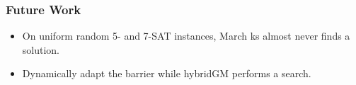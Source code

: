 \documentclass[aspectratio=169%
,serif,mathserif]{beamer}
\begin{document}
\begin{frame}
	\frametitle{Future Work}
	\begin{itemize}
		\item On uniform random 5- and 7-SAT instances, March ks almost never finds a solution.
		\item Dynamically adapt the barrier while hybridGM performs a search.
	\end{itemize}
\end{frame}






\begin{frame}
\hfill
{}
\linespread{3}\selectfont
\end{frame}
\end{document}
